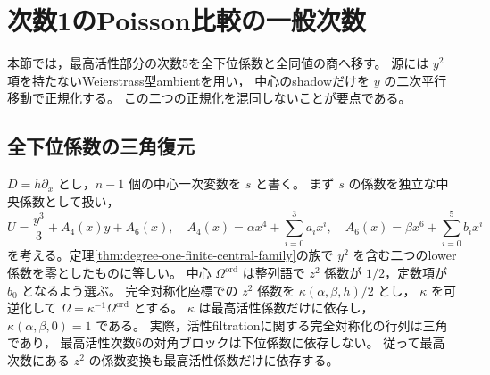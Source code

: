 \section{次数1のPoisson比較の一般次数}
\label{sec:degree-one-shadow-degree}

本節では，最高活性部分の次数5を全下位係数と全同値の商へ移す。
源には $y^2$ 項を持たないWeierstrass型ambientを用い，
中心のshadowだけを $y$ の二次平行移動で正規化する。
この二つの正規化を混同しないことが要点である。

\subsection{全下位係数の三角復元}

$D=h\partial_x$ とし，$n-1$ 個の中心一次変数を $s$ と書く。
まず $s$ の係数を独立な中央係数として扱い，
\[
 U=\frac{y^3}{3}+A_4(x)y+A_6(x),\quad
 A_4(x)=\alpha x^4+\sum_{i=0}^3a_i x^i,\quad
 A_6(x)=\beta x^6+\sum_{i=0}^5b_i x^i
\]
を考える。定理\ref{thm:degree-one-finite-central-family}の族で
$y^2$ を含む二つのlower係数を零としたものに等しい。
中心 $\Omega^{\mathrm{ord}}$ は整列語で $z^2$ 係数が $1/2$，定数項が $b_0$ となるよう選ぶ。
完全対称化座標での $z^2$ 係数を $\kappa(\alpha,\beta,h)/2$ とし，
$\kappa$ を可逆化して $\Omega=\kappa^{-1}\Omega^{\mathrm{ord}}$ とする。
$\kappa$ は最高活性係数だけに依存し，$\kappa(\alpha,\beta,0)=1$ である。
実際，活性filtrationに関する完全対称化の行列は三角であり，
最高活性次数6の対角ブロックは下位係数に依存しない。
従って最高次数にある $z^2$ の係数変換も最高活性係数だけに依存する。

